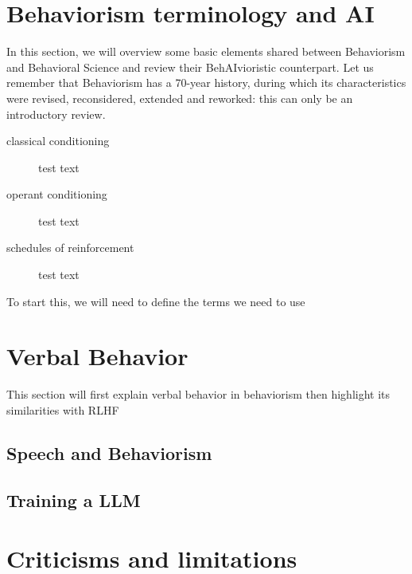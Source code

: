 \documentclass[letterpaper,11pt,twocolumn]{article}
\begin{document}

\section*{Behaviorism terminology and AI}
In this section, we will overview some basic elements shared between Behaviorism and Behavioral Science and review their BehAIvioristic counterpart. Let us remember that Behaviorism has a 70-year history\cite{schneiderHistoryTermRadical1987}, during which its characteristics were revised, reconsidered, extended and reworked: this can only be an introductory review.
\begin{description}
    \item[classical conditioning] test text
    \item[operant conditioning] test text
    \item[schedules of reinforcement] test text
\end{description}

To start this, we will need to define the terms we need to use

\section*{Verbal Behavior}
This section will first explain verbal behavior in behaviorism then highlight its similarities with RLHF

\subsection*{Speech and Behaviorism}

\subsection*{Training a LLM}


\section*{Criticisms and limitations}
\end{document}
